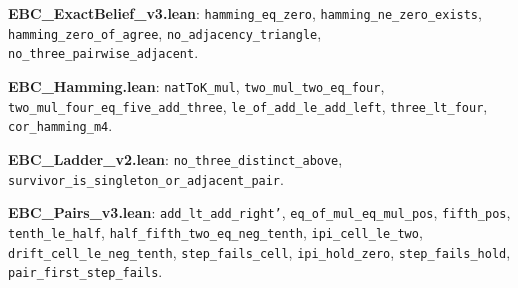 \textbf{EBC\_ExactBelief\_v3.lean}: \texttt{hamming\_\allowbreak{}eq\_\allowbreak{}zero}, \texttt{hamming\_\allowbreak{}ne\_\allowbreak{}zero\_\allowbreak{}exists}, \texttt{hamming\_\allowbreak{}zero\_\allowbreak{}of\_\allowbreak{}agree}, \texttt{no\_\allowbreak{}adjacency\_\allowbreak{}triangle}, \texttt{no\_\allowbreak{}three\_\allowbreak{}pairwise\_\allowbreak{}adjacent}.

\textbf{EBC\_Hamming.lean}: \texttt{natToK\_\allowbreak{}mul}, \texttt{two\_\allowbreak{}mul\_\allowbreak{}two\_\allowbreak{}eq\_\allowbreak{}four}, \texttt{two\_\allowbreak{}mul\_\allowbreak{}four\_\allowbreak{}eq\_\allowbreak{}five\_\allowbreak{}add\_\allowbreak{}three}, \texttt{le\_\allowbreak{}of\_\allowbreak{}add\_\allowbreak{}le\_\allowbreak{}add\_\allowbreak{}left}, \texttt{three\_\allowbreak{}lt\_\allowbreak{}four}, \texttt{cor\_\allowbreak{}hamming\_\allowbreak{}m4}.

\textbf{EBC\_Ladder\_v2.lean}: \texttt{no\_\allowbreak{}three\_\allowbreak{}distinct\_\allowbreak{}above}, \texttt{survivor\_\allowbreak{}is\_\allowbreak{}singleton\_\allowbreak{}or\_\allowbreak{}adjacent\_\allowbreak{}pair}.

\textbf{EBC\_Pairs\_v3.lean}: \texttt{add\_\allowbreak{}lt\_\allowbreak{}add\_\allowbreak{}right'}, \texttt{eq\_\allowbreak{}of\_\allowbreak{}mul\_\allowbreak{}eq\_\allowbreak{}mul\_\allowbreak{}pos}, \texttt{fifth\_\allowbreak{}pos}, \texttt{tenth\_\allowbreak{}le\_\allowbreak{}half}, \texttt{half\_\allowbreak{}fifth\_\allowbreak{}two\_\allowbreak{}eq\_\allowbreak{}neg\_\allowbreak{}tenth}, \texttt{ipi\_\allowbreak{}cell\_\allowbreak{}le\_\allowbreak{}two}, \texttt{drift\_\allowbreak{}cell\_\allowbreak{}le\_\allowbreak{}neg\_\allowbreak{}tenth}, \texttt{step\_\allowbreak{}fails\_\allowbreak{}cell}, \texttt{ipi\_\allowbreak{}hold\_\allowbreak{}zero}, \texttt{step\_\allowbreak{}fails\_\allowbreak{}hold}, \texttt{pair\_\allowbreak{}first\_\allowbreak{}step\_\allowbreak{}fails}.
